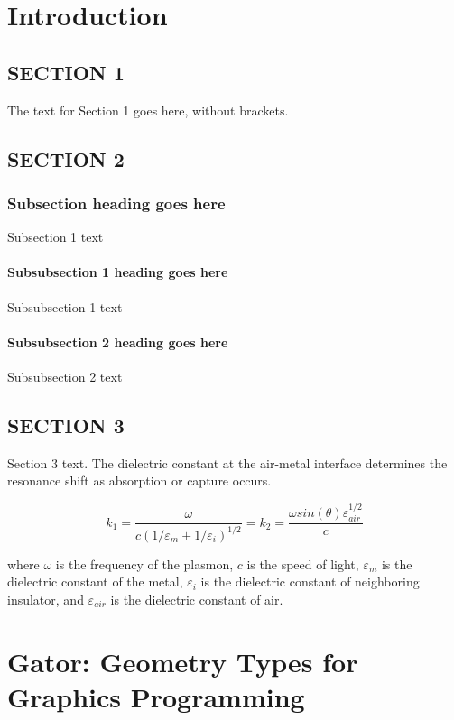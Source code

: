 \documentclass[phd,tocprelim]{cornell}
\begin{document}
\chapter{Introduction}

\section{SECTION 1}
The text for Section 1 goes here, without brackets.

\section{SECTION 2}

\subsection{Subsection heading goes here}

Subsection 1 text

\subsubsection{Subsubsection 1 heading goes here}
Subsubsection 1 text

\subsubsection{Subsubsection 2 heading goes here}
Subsubsection 2 text

\section{SECTION 3}
Section 3 text. The dielectric constant at the air-metal interface
determines the resonance shift as absorption or capture occurs.

\begin{equation}
k_1=\frac{\omega }{c({1/\varepsilon_m + 1/\varepsilon_i})^{1/2}}=k_2=\frac{\omega
sin(\theta)\varepsilon_{air}^{1/2}}{c}
\end{equation}

\noindent
where $\omega$ is the frequency of the plasmon, $c$ is the speed of
light, $\varepsilon_m$ is the dielectric constant of the metal,
$\varepsilon_i$ is the dielectric constant of neighboring insulator,
and $\varepsilon_{air}$ is the dielectric constant of air.

\chapter{Gator: Geometry Types for Graphics Programming}
\end{document}
